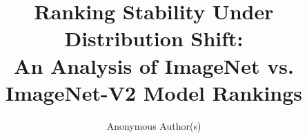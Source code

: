 \documentclass[10pt,twocolumn]{article}
\title{Ranking Stability Under Distribution Shift: \\
An Analysis of ImageNet vs. ImageNet-V2 Model Rankings}
\author{Anonymous Author(s)}
\date{}
\begin{document}
\maketitle

\begin{abstract}

\end{abstract}











\end{document}
